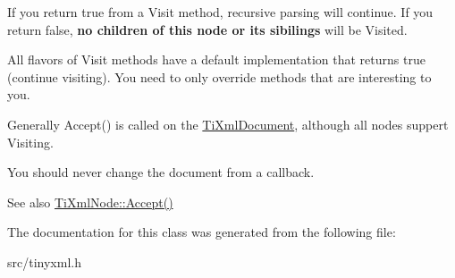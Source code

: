 If you return \textquotesingle{}true\textquotesingle{} from a Visit method, recursive parsing will continue. If you return false, {\bfseries no children of this node or its sibilings} will be Visited.

All flavors of Visit methods have a default implementation that returns \textquotesingle{}true\textquotesingle{} (continue visiting). You need to only override methods that are interesting to you.

Generally Accept() is called on the \hyperlink{classTiXmlDocument}{Ti\+Xml\+Document}, although all nodes suppert Visiting.

You should never change the document from a callback.

\begin{DoxySeeAlso}{See also}
\hyperlink{classTiXmlNode_acc0f88b7462c6cb73809d410a4f5bb86}{Ti\+Xml\+Node\+::\+Accept()} 
\end{DoxySeeAlso}


The documentation for this class was generated from the following file\+:\begin{DoxyCompactItemize}
\item 
src/tinyxml.\+h\end{DoxyCompactItemize}
